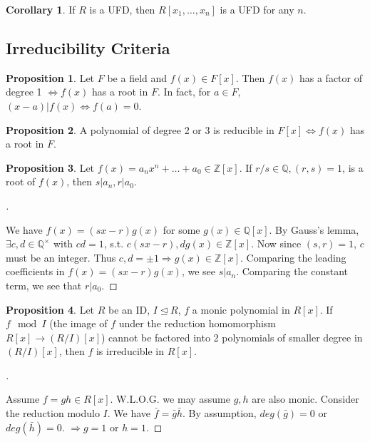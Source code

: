 \documentclass{article}
\theoremstyle{definition}
\newtheorem{cor}{Corollary}
\newtheorem{prop}{Proposition}
\newenvironment{proofs}[1][\proofname]{%
  \begin{proof}[#1]$ $\par\nobreak\ignorespaces
}{%
  \end{proof}
}
\begin{document}
  \begin{cor}
	If $R$ is a UFD, then $R[x_1, \hdots, x_n]$ is a UFD for any $n$.
  \end{cor}
  
  \subsection{Irreducibility Criteria}
  
  \begin{prop}
	Let $F$ be a field and $f(x) \in F[x]$. Then $f(x)$ has a factor of degree 1 $\Leftrightarrow f(x)$ has a root in $F$. In fact, for $a \in F$, $(x - a)|f(x) \Leftrightarrow f(a) = 0$.  
  \end{prop}
  
  \begin{prop}
	A polynomial of degree 2 or 3 is reducible in $F[x] \Leftrightarrow f(x)$ has a root in $F$.
  \end{prop}
  
  \begin{prop}
	Let $f(x) = a_n x^n + \hdots + a_0 \in \mathbb{Z}[x]$. If $r/s \in \mathbb{Q}, (r, s) = 1$, is a root of $f(x)$, then $s|a_n, r|a_0$. 
  \end{prop}
  
  \begin{proofs}
	We have $f(x) = (sx-r) g(x)$ for some $g(x) \in \mathbb{Q}[x]$. By Gauss's lemma, $\exists c, d \in \mathbb{Q}^\times$ with $cd = 1$, s.t. $c(sx-r), dg(x) \in \mathbb{Z}[x]$. Now since $(s, r) = 1$, $c$ must be an integer. Thus $c, d = \pm 1 \Rightarrow g(x) \in \mathbb{Z}[x]$. Comparing the leading coefficients in $f(x) = (sx - r) g(x)$, we see $s | a_n$. Comparing the constant term, we see that $r|a_0$.  
  \end{proofs}
  
  \begin{prop}
	Let $R$ be an ID, $I \trianglelefteq R$, $f$ a monic polynomial in $R[x]$. If $f \mod I$ (the image of $f$ under the reduction homomorphism $R[x] \rightarrow (R/I)[x]$) cannot be factored into 2 polynomials of smaller degree in $(R/I)[x]$, then $f$ is irreducible in $R[x]$.  
  \end{prop}
  
  \begin{proofs}
	Assume $f = gh \in R[x]$. W.L.O.G. we may assume $g, h$ are also monic. Consider the reduction modulo $I$. We have $\bar{f} = \bar{g} \bar{h}$. By assumption, $deg(\bar{g}) = 0$ or $deg(\bar{h}) = 0$. $\Rightarrow g = 1$ or $h = 1$. 
  \end{proofs}
  
\end{document}
